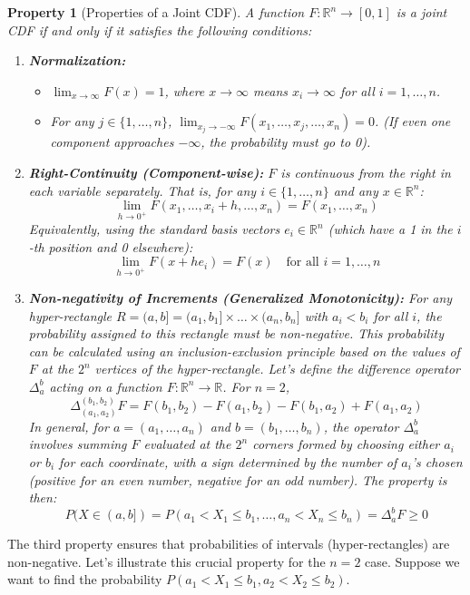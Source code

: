 \documentclass[11pt, a4paper]{article}
\newtheorem{property}[theorem]{Property}
\theoremstyle{definition} %
\newcommand{\R}{\mathbb{R}}
\begin{document}
\begin{property}[Properties of a Joint CDF]
A function $F: \R^n \to [0, 1]$ is a joint CDF if and only if it satisfies the following conditions:
\begin{enumerate}
    \item \textbf{Normalization:}
        \begin{itemize}
            \item $\lim_{x \to \infty} F(x) = 1$, where $x \to \infty$ means $x_i \to \infty$ for all $i=1, \dots, n$.
            \item For any $j \in \{1, \dots, n\}$, $\lim_{x_j \to -\infty} F(x_1, \dots, x_j, \dots, x_n) = 0$. (If even one component approaches $-\infty$, the probability must go to 0).
        \end{itemize}
    \item \textbf{Right-Continuity (Component-wise):} $F$ is continuous from the right in each variable separately. That is, for any $i \in \{1, \dots, n\}$ and any $x \in \R^n$:
        \[ \lim_{h \to 0^+} F(x_1, \dots, x_i + h, \dots, x_n) = F(x_1, \dots, x_n) \]
        Equivalently, using the standard basis vectors $e_i \in \R^n$ (which have a 1 in the $i$-th position and 0 elsewhere):
        \[ \lim_{h \to 0^+} F(x + h e_i) = F(x) \quad \text{for all } i=1, \dots, n \]
    \item \textbf{Non-negativity of Increments (Generalized Monotonicity):} For any hyper-rectangle $R = (a, b] = (a_1, b_1] \times \dots \times (a_n, b_n]$ with $a_i < b_i$ for all $i$, the probability assigned to this rectangle must be non-negative. This probability can be calculated using an inclusion-exclusion principle based on the values of $F$ at the $2^n$ vertices of the hyper-rectangle. Let's define the difference operator $\Delta_a^b$ acting on a function $F: \R^n \to \R$. For $n=2$,
    \[ \Delta_{(a_1, a_2)}^{(b_1, b_2)} F = F(b_1, b_2) - F(a_1, b_2) - F(b_1, a_2) + F(a_1, a_2) \]
    In general, for $a = (a_1, \dots, a_n)$ and $b = (b_1, \dots, b_n)$, the operator $\Delta_a^b$ involves summing $F$ evaluated at the $2^n$ corners formed by choosing either $a_i$ or $b_i$ for each coordinate, with a sign determined by the number of $a_i$'s chosen (positive for an even number, negative for an odd number). The property is then:
    \[ P(X \in (a, b]) = P(a_1 < X_1 \le b_1, \dots, a_n < X_n \le b_n) = \Delta_a^b F \ge 0 \]
\end{enumerate}
\end{property}

The third property ensures that probabilities of intervals (hyper-rectangles) are non-negative. Let's illustrate this crucial property for the $n=2$ case. Suppose we want to find the probability $P(a_1 < X_1 \le b_1, a_2 < X_2 \le b_2)$.
\end{document}
